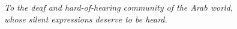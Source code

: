 \chapter*{}
\thispagestyle{empty}
\vspace*{\fill}
\begin{center}
\itshape
To the deaf and hard-of-hearing community of the Arab world,\\
whose silent expressions deserve to be heard.
\end{center}
\vspace*{\fill}
